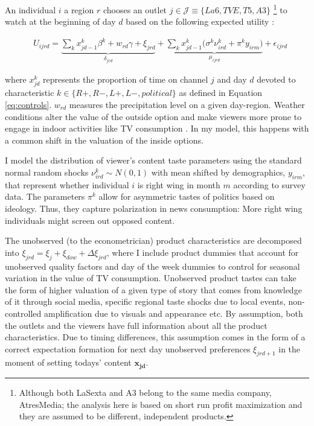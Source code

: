 \documentclass[12pt]{article}
\begin{document}
	An individual $ i $  a region $r$ chooses an outlet $ j \in \mathcal{J}\equiv \{La6,TVE,T5,A3\}$ \footnote{Although both LaSexta and A3 belong to the same media company, AtresMedia; the analysis here is based on short run profit maximization and they are assumed to be different, independent products. } to watch at the beginning of day $d$ based on the following expected utility : 
	
	
	\begin{equation}\label{eq:utility}
		\begin{aligned}
			& U_{ijrd}= \underbrace{\sum_k x_{jd-1}^k\beta^k+w_{rd}   \gamma  +  \xi_{jrd}}_{\delta_{jrd}}  + \underbrace{  \sum_k x_{jd-1}^k \Big( \sigma^k \nu_{ird}^k  + \pi^ky_{irm} \Big)}_{\mu_{ijrd}}+\epsilon_{ijrd} 
		\end{aligned}
	\end{equation} 
	
	where $ x_{jd}^k $ represents the  proportion of time on channel $ j $ and day $ d$ devoted to characteristic $ k \in \{R+,R-,L+,L-,political\}$ as defined in Equation \ref{eq:controls}. $w_{rd}$ measures the precipitation level on a given day-region. Weather conditions alter the value of the outside option and make viewers more prone to engage in indoor activities like TV consumption \citep{wilbur}. In my model, this happens with a common shift in the valuation of the inside options. 
	
	I model the distribution of viewer's content taste parameters using the standard normal random shocks $ \nu_{ird}^k \sim N(0,1)$ with mean shifted by  demographics, $ y_{irm} $, that represent whether individual $i$ is right wing in month $m$ according to survey data.	The parameters $\pi^k$ allow for asymmetric tastes of politics based on ideology. Thus, they capture polarization in news consumption: More right wing individuals might screen out opposed content. 

The unobserved (to the econometrician) product characteristics are decomposed into $\xi_{jrd}= \xi_j + \xi_{dow} + \Delta \xi_{jrd}$, where I include product dummies that account for unobserved quality factors and day of the week dummies to control for  seasonal variation in the value of TV consumption. Unobserved product tastes can take the form of higher valuation of a given type of story that comes from knowledge of it through social media, specific regional taste shocks due to local events, non-controlled amplification due to visuals and appearance etc. By assumption, both the outlets and the viewers have full information about all the product characteristics. Due to timing differences, this assumption comes in the form of a correct expectation formation for next day unobserved preferences $ \xi_{jrd+1}$ in the moment of setting todays' content $\bm{x_{jd}}$. 
	
\end{document}
